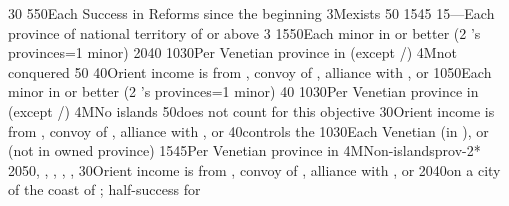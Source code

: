 {}{30}{}%
%
%
{5}{50}{Each Success in Reforms since the beginning}%
%
\EUobjective3M{\payscrimee exists}{}%
{}{50}{}%
%
%
{15}{45}{}%
%
%
{15}{---}{Each province of national territory of  or
   above 3}%
%
 
%
%
{15}{50}{Each minor in \EG or better (2 's provinces=1 minor)}%
%
%
{20}{40}{}%
%
%
{10}{30}{Per Venetian province in \regionBalkans (except
  \provinceHellas/\provinceMoreas)}%
%
\EUobjective4M{\paysmamelouks not conquered}{}%
{}{50}{}%
%
%
{}{40}{Orient income is from , convoy of \villeIzmir,
  alliance with \paysaden, \paysoman or \paysgujarat}%
%
%
%
{10}{50}{Each minor in \EG or better (2 's provinces=1 minor)}%
%
%
{}{40}{}%
%
%
{10}{30}{Per Venetian province in \regionBalkans (except
  \provinceHellas/\provinceMoreas)}%
%
\EUobjective4M{No \TUR islands}{}%
{}{50}{\provinceRhodos does not count for this objective}%
%
%
{}{30}{Orient income is from , convoy of \villeIzmir,
  alliance with \paysaden, \paysoman or \paysgujarat}%
%
%
%
{}{40}{\paysmajeurVenise controls the }%
%
%
{10}{30}{Each Venetian \Presidio (in ), or \regionBalkans
  (not in owned province)}%
%
%
{15}{45}{Per Venetian province in \regionBalkans}%
%
\EUobjective4M{Non-\TUR islands}{prov-2*}%
{20}{50}{\provinceChypre, \provinceKreta, \provinceCyclades, \provinceCorfu,
  \provinceMalta, \provinceRhodos}%
%
%
%
{}{30}{Orient income is from , convoy of \villeIzmir,
  alliance with \paysaden, \paysoman or \paysgujarat}%
%
 
%
%
{20}{40}{\COL on a city of the coast of \continentIndia; half-success for
  \granderegionCeylan}%
%
%
